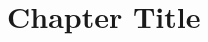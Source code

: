 % 
%





\renewcommand{\chabbr}{AAAAAA}

\chapterimage{\noheaderimage}

\chapter{Chapter Title}\label{\chabbr:ch:ChapterTitle} %

